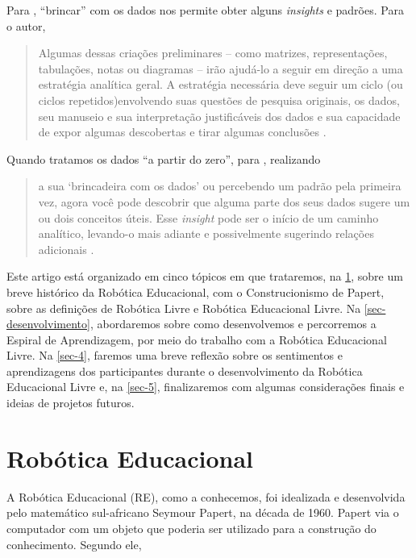 \documentclass{textolivre}
\begin{document}
Para \textcite[p. 139]{yin2015}, “brincar” com os dados nos permite obter alguns \textit{insights} e padrões. Para o autor,

\begin{quote}
Algumas dessas criações preliminares – como matrizes, representações, tabulações, notas ou diagramas – irão ajudá-lo a seguir em direção a uma estratégia analítica geral. A estratégia necessária deve seguir um ciclo (ou ciclos repetidos)envolvendo suas questões de pesquisa originais, os dados, seu manuseio e sua interpretação justificáveis dos dados e sua capacidade de expor algumas descobertas e tirar algumas conclusões \cite[p. 140]{yin2015}.
\end{quote}

Quando tratamos os dados “a partir do zero”, para \textcite{yin2015}, realizando

\begin{quote}
a sua ‘brincadeira com os dados’ ou percebendo um padrão pela primeira vez, agora você pode descobrir que alguma parte dos seus dados sugere um ou dois conceitos úteis. Esse \textit{insight} pode ser o início de um caminho analítico, levando-o mais adiante e possivelmente sugerindo relações adicionais \cite[p. 141]{yin2015}.
\end{quote}

Este artigo está organizado em cinco tópicos em que trataremos, na \cref{sec-roboticaeducacional}, sobre um breve histórico da Robótica Educacional, com o Construcionismo de Papert, sobre as definições de Robótica Livre e Robótica Educacional Livre. Na \cref{sec-desenvolvimento}, abordaremos sobre como desenvolvemos e percorremos a Espiral de Aprendizagem, por meio do trabalho com a Robótica Educacional Livre. Na \cref{sec-4}, faremos uma breve reflexão sobre os sentimentos e aprendizagens dos participantes durante o desenvolvimento da Robótica Educacional Livre e, na \cref{sec-5}, finalizaremos com algumas considerações finais e ideias de projetos futuros.

\section{Robótica Educacional}\label{sec-roboticaeducacional}
A Robótica Educacional (RE), como a conhecemos, foi idealizada e desenvolvida pelo matemático sul-africano Seymour Papert, na década de 1960. Papert via o computador com um objeto que poderia ser utilizado para a construção do conhecimento. Segundo ele, 
\end{document}
